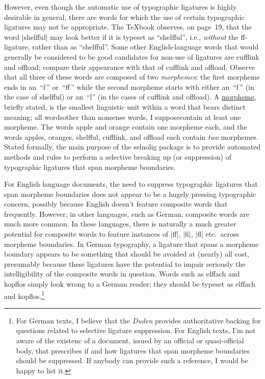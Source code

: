 \documentclass[11pt]{article}
\newcommand{\pkg}[1]{\textsf{#1}}
\begin{document}
However, even though the automatic use of typographic ligatures is highly desirable in general, there are words for which the use of certain typographic ligatures may not be appropriate. The \TeX book observes, on page~19, that the word |shelfful| may look better if it is typeset as \enquote{shelfful}, i.e., \emph{without} the ff-ligature, rather than as \enquote{\mbox{shelfful}}. Some other English-language words that would generally be considered to be good candidates for non-use of ligatures are \mbox{cufflink} and \mbox{offload}; compare their appearance with that of cufflink and offload. Observe that all three of these words are composed of two \emph{morphemes}: the first morpheme ends in an~\enquote{f\,} or~\enquote{ff\,} while the second morpheme starts with either an~\enquote{f\,} (in the case of shelfful) or an~\enquote{l} (in the cases of cufflink and offload). A \href{http://en.wikipedia.org/wiki/Morpheme}{morpheme}, briefly stated, is the smallest linguistic unit within a word that bears distinct meaning; all words\textemdash other than nonsense words, I suppose\textemdash contain at least one morpheme. The words apple and orange contain one morpheme each, and the words apples, oranges, shelfful, cufflink, and offload each contain \emph{two} morphemes. Stated formally, the main purpose of the \pkg{selnolig} package is to provide automated methods and rules to perform a selective breaking up (or suppression) of typographic ligatures that span morpheme boundaries.

For English language documents, the need to suppress typographic ligatures that span morpheme boundaries does not appear to be a hugely pressing typographic concern, possibly because English doesn't feature composite words that frequently. However, in other languages, such as German, composite words are much more common. In these languages, there is naturally a much greater potential for composite words to feature instances of |ff|, |fi|, |fl| etc.\ across morpheme boundaries. In German typography, a ligature that spans a morpheme boundary appears to be something that should be avoided at (nearly) all cost, presumably because these ligatures have the potential to impair seriously the intelligibility of the composite words in question. Words such as \mbox{elffach} and \mbox{kopflos} simply look wrong to a German reader; they should be typeset as elffach and kopflos.\footnote{For German texts, I believe that the \emph{Duden} provides authoritative backing for questions related to selective ligature suppression. For English texts, I'm not aware of the existenc of a document, issued by an official or quasi-official body, that prescribes if and how ligatures that span morpheme boundaries should be suppressed. If anybody can provide such a reference, I would be happy to list it.}
\end{document}
